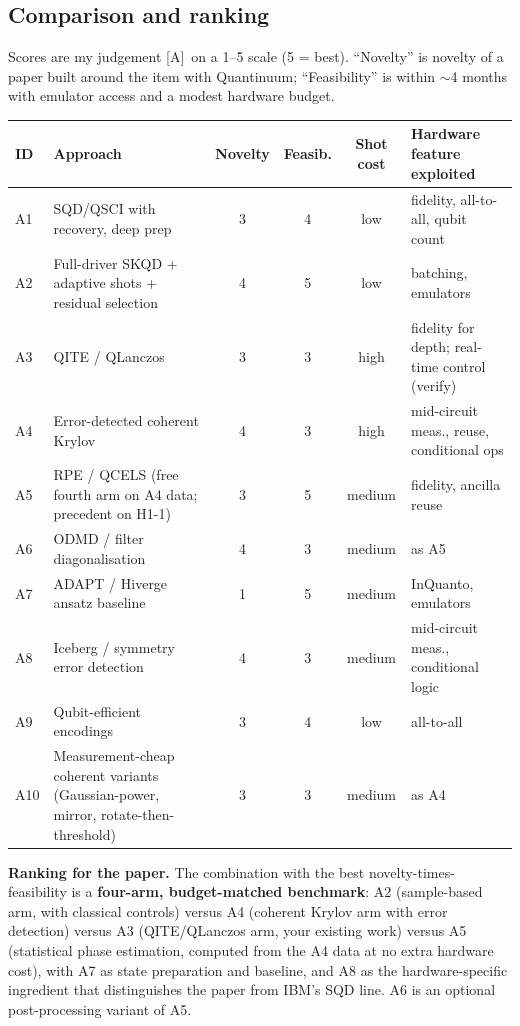 \documentclass[11pt,a4paper]{article}
\newcommand{\lA}{\textcolor{notegray}{[A]}}  %
\begin{document}
\subsection{Comparison and ranking}
Scores are my judgement \lA\ on a 1--5 scale (5 = best). ``Novelty'' is novelty of a paper built around the item with Quantinuum; ``Feasibility'' is within $\sim$4 months with emulator access and a modest hardware budget.
\begin{center}\small
\begin{tabularx}{\linewidth}{@{}lYcccY@{}}
\toprule
ID & Approach & Novelty & Feasib. & Shot cost & Hardware feature exploited\\\midrule
A1 & SQD/QSCI with recovery, deep prep & 3 & 4 & low & fidelity, all-to-all, qubit count\\
A2 & Full-driver SKQD + adaptive shots + residual selection & 4 & 5 & low & batching, emulators\\
A3 & QITE / QLanczos & 3 & 3 & high & fidelity for depth; real-time control (verify)\\
A4 & Error-detected coherent Krylov & 4 & 3 & high & mid-circuit meas., reuse, conditional ops\\
A5 & RPE / QCELS (free fourth arm on A4 data; precedent on H1-1) & 3 & 5 & medium & fidelity, ancilla reuse\\
A6 & ODMD / filter diagonalisation & 4 & 3 & medium & as A5\\
A7 & ADAPT / Hiverge ansatz baseline & 1 & 5 & medium & InQuanto, emulators\\
A8 & Iceberg / symmetry error detection & 4 & 3 & medium & mid-circuit meas., conditional logic\\
A9 & Qubit-efficient encodings & 3 & 4 & low & all-to-all\\
A10 & Measurement-cheap coherent variants (Gaussian-power, mirror, rotate-then-threshold) & 3 & 3 & medium & as A4\\
\bottomrule
\end{tabularx}
\end{center}
\textbf{Ranking for the paper.} The combination with the best novelty-times-feasibility is a \textbf{four-arm, budget-matched benchmark}: A2 (sample-based arm, with classical controls) versus A4 (coherent Krylov arm with error detection) versus A3 (QITE/QLanczos arm, your existing work) versus A5 (statistical phase estimation, computed from the A4 data at no extra hardware cost), with A7 as state preparation and baseline, and A8 as the hardware-specific ingredient that distinguishes the paper from IBM's SQD line. A6 is an optional post-processing variant of A5.
\end{document}
